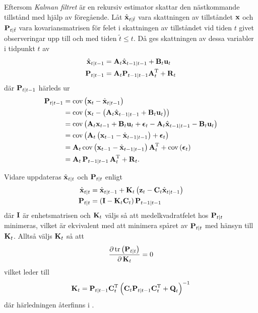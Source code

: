 \documentclass[11pt]{article}
\newcommand{\bfr}[1]{\textbf{\textrm{{#1}}}}
\begin{document}
\begin{flushleft}
Eftersom \emph{Kalman filtret} är en rekursiv estimator skattar den nästkommande tillstånd med hjälp av föregående. Låt $\hat{\bfr{x}}_{t\vert \tilde{t}}$ vara skattningen av tillståndet $\bfr{x}$ och $\bfr{P}_{t\vert \tilde{t}}$ vara kovariansmatrisen för felet i skattningen av tillståndet vid tiden $t$ givet observeringar upp till och med tiden $\tilde{t}\leq t$. Då ges skattningen av dessa variabler i tidpunkt $t$ av
\begin{align*}
	\hat{\bfr{x}}_{t\vert t-1} &= \bfr{A}_{t}\hat{\bfr{x}}_{t-1\vert t-1} + \bfr{B}_{t}\bfr{u}_{t} \\
	\bfr{P}_{t\vert t-1} & = \bfr{A}_{t}\bfr{P}_{t-1\vert t-1}\bfr{A}_{t}^{\mathrm{T}} + \bfr{R}_t
\end{align*}
där $\bfr{P}_{t\vert t-1}$ härleds ur
\begin{align*}
	\bfr{P}_{t\vert t-1} &= \mathrm{cov}\left(\bfr{x}_{t}-\hat{\bfr{x}}_{t\vert t-1}\right) \\
	&= \mathrm{cov}\left(\bfr{x}_{t}-\left(\bfr{A}_{t}\hat{\bfr{x}}_{t-1\vert t-1} + \bfr{B}_{t}\bfr{u}_{t}\right)\right) \\
	&= \mathrm{cov}\left(\bfr{A}_{t}\bfr{x}_{t-1} + \bfr{B}_{t}\bfr{u}_t + \boldsymbol{\epsilon}_{t} - \bfr{A}_{t}\hat{\bfr{x}}_{t-1\vert t-1} - \bfr{B}_{t}\bfr{u}_t\right) \\
	&= \mathrm{cov}\left(\bfr{A}_{t}\left(\bfr{x}_{t-1} - \hat{\bfr{x}}_{t-1\vert t-1}\right) + \boldsymbol{\epsilon}_{t}\right) \\
	&= \bfr{A}_{t}\,\mathrm{cov}\left(\bfr{x}_{t-1} - \hat{\bfr{x}}_{t-1\vert t-1}\right)\bfr{A}_{t}^{\mathrm{T}} + \mathrm{cov}\left(\boldsymbol{\epsilon}_{t}\right) \\
	&= \bfr{A}_{t}\,\bfr{P}_{t-1\vert t-1}\,\bfr{A}_{t}^{\mathrm{T}} + \bfr{R}_{t}.
\end{align*}

Vidare uppdateras $\hat{\bfr{x}}_{t\vert t}$ och $\bfr{P}_{t\vert t}$ enligt
\begin{align*}
	\hat{\bfr{x}}_{t\vert t} &= \hat{\bfr{x}}_{t\vert t-1} + \bfr{K}_{t}\left(\bfr{z}_{t} - \bfr{C}_{t}\hat{\bfr{x}}_{t\vert t-1}\right) \\
	\bfr{P}_{t\vert t} &= \left(\bfr{I} - \bfr{K}_{t}\bfr{C}_{t}\right)\bfr{P}_{t-1\vert t-1}
\end{align*}
där $\bfr{I}$ är enhetsmatrisen och $\bfr{K}_{t}$ väljs så att medelkvadratfelet hos $\bfr{P}_{t\vert t}$ minimeras, vilket är ekvivalent med att minimera spåret av $\bfr{P}_{t\vert t}$ med hänsyn till $\bfr{K}_{t}$. Alltså väljs $\bfr{K}_{t}$ så att
\begin{align*}
	\frac{\partial\,\mathrm{tr}\left(\bfr{P}_{t\vert t}\right)}{\partial\,\bfr{K}_{t}} = 0
\end{align*}
vilket leder till
\begin{align*}
	\bfr{K}_{t} = \bfr{P}_{t\vert t-1}\bfr{C}_{t}^{\mathrm{T}}\left(\bfr{C}_{t}\bfr{P}_{t\vert t-1}\bfr{C}_{t}^{\mathrm{T}} + \bfr{Q}_{t}\right)^{-1}
\end{align*}
där härledningen återfinns i \cite{filtering}. 


\end{flushleft}
\end{document}
